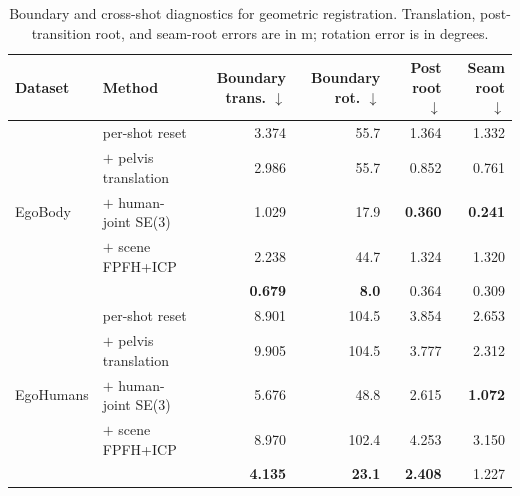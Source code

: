 \begin{table}[t]
  \centering
  \caption{Boundary and cross-shot diagnostics for geometric registration.
  Translation, post-transition root, and seam-root errors are in m; rotation
  error is in degrees.}
  \label{tab:supp-registration-diagnostics}
  \supptablesize
  \setlength{\tabcolsep}{2.8pt}
  \begin{tabular}{llrrrr}
    \toprule
    Dataset & Method & Boundary trans. $\downarrow$ & Boundary rot. $\downarrow$ & Post root $\downarrow$ & Seam root $\downarrow$ \\
    \midrule
    \multirow{5}{*}{EgoBody}
      & \humanthree{} per-shot reset & 3.374 & 55.7 & 1.364 & 1.332 \\
      & $+$ pelvis translation & 2.986 & 55.7 & 0.852 & 0.761 \\
      & $+$ human-joint SE(3) & 1.029 & 17.9 & \textbf{0.360} & \textbf{0.241} \\
      & $+$ scene FPFH+ICP & 2.238 & 44.7 & 1.324 & 1.320 \\
      & \method{} & \textbf{0.679} & \textbf{8.0} & 0.364 & 0.309 \\
    \midrule
    \multirow{5}{*}{EgoHumans}
      & \humanthree{} per-shot reset & 8.901 & 104.5 & 3.854 & 2.653 \\
      & $+$ pelvis translation & 9.905 & 104.5 & 3.777 & 2.312 \\
      & $+$ human-joint SE(3) & 5.676 & 48.8 & 2.615 & \textbf{1.072} \\
      & $+$ scene FPFH+ICP & 8.970 & 102.4 & 4.253 & 3.150 \\
      & \method{} & \textbf{4.135} & \textbf{23.1} & \textbf{2.408} & 1.227 \\
    \bottomrule
  \end{tabular}
\end{table}

